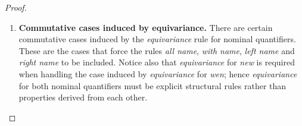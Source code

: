 \begin{proof}
\begin{enumerate}[label=\textbf{\Alph*},ref=\Alph*,leftmargin=*]
\begin{enumerate}[label*=\textbf{.\arabic*}]
\item Consider the principal case involving the \textit{medial} rule.
In this case, the bottommost rule of a proof is of the form 
\[
\infer[\mbox{such that $\vdash \left(\left( P \wwith R \right) \cseq \left( Q \wwith S \right)\right) \cpar W$ holds.}]{
\left(\left( P \cseq Q \right) \wwith \left( R \cseq S \right)\right) \cpar W
}{
\left(\left( P \wwith R \right) \cseq \left( Q \wwith S \right)\right) \cpar W
}
\]
By the induction hypothesis, for $1 \leq i \leq n$ there exists $U_i$ and $V_i$ such that $\vdash \left( P \wwith R \right) \cpar U_i$ and $\vdash \left( Q \wwith S \right) \cpar V_i$ hold, and $n$-ary killing context $\tcontext{}$ such that 
$
\vcenter{\infer[]{W}{\tcontext{U_i \cseq V_i \colon 1 \leq i \leq n}}}$.
Furthermore, the size of the proofs of $\left( P \wwith R \right) \cpar U_i$ and $\left( Q \wwith S \right) \cpar V_i$ are strictly less than the size of the proof of $\left(\left( P \wwith R \right) \cseq \left( Q \wwith S \right)\right) \cpar W$. Hence by the induction hypothesis again, $\vdash P \cpar U_i$, $\vdash R \cpar U_i$, $\vdash Q \cpar V_i$ and $\vdash S \cpar V_i$.
Hence we can construct the following two proofs, as required.
\[
\infer[]{
\left( P \cseq Q \right) \cpar W
}{
\infer[]{
\left( P \cseq Q \right) \cpar \tcontext{U_i \cseq V_i \colon 1 \leq i \leq n}
}{
\infer[]{
\tcontext{\left( P \cseq Q \right) \cpar \left(U_i \cseq V_i\right) \colon 1 \leq i \leq n}
}{
\infer[]{
\tcontext{\left( P \cpar U_i \right) \cseq \left(Q \cpar V_i\right) \colon 1 \leq i \leq n}
}{
\infer[]{
\tcontext{\cunit  \colon 1 \leq i \leq n}
}{
\cunit
}}}}}
\qquad
\infer[]{
\left( R \cseq S \right) \cpar W
}{
\infer[]{
\left( R \cseq S \right) \cpar \tcontext{U_i \cseq V_i \colon 1 \leq i \leq n}
}{
\infer[]{
\tcontext{\left( R \cseq S \right) \cpar \left(U_i \cseq V_i\right) \colon 1 \leq i \leq n}
}{
\infer[]{
\tcontext{\left( R \cpar U_i \right) \cseq \left(S \cpar V_i\right) \colon 1 \leq i \leq n}
}{
\infer[]{
\tcontext{\cunit \colon 1 \leq i \leq n}
}{
\cunit
}}}}}
\]


\end{enumerate}


\item \textbf{Commutative cases induced by equivariance.}
There are certain commutative cases induced by the \textit{equivariance} rule for nominal quantifiers.
These are the cases that force the rules \textit{all name}, \textit{with name}, \textit{left name} and \textit{right name} to be included.
Notice also that \textit{equivariance} for \textit{new} is required when handling the case induced by \textit{equivariance} for \textit{wen}; hence \textit{equivariance} for both nominal quantifiers must be explicit structural rules rather than properties derived from each other.



\end{enumerate}
\end{proof}
